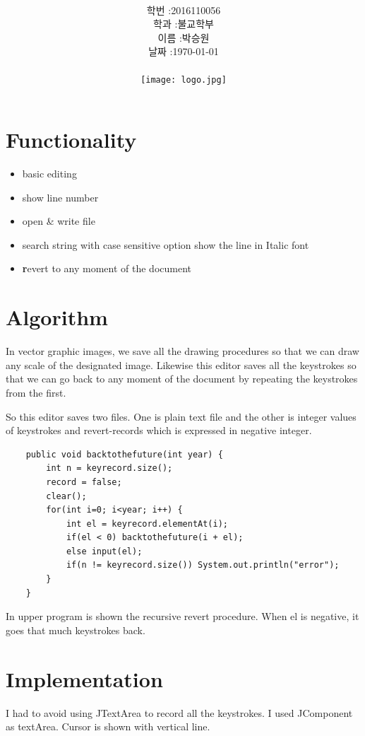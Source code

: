 \documentclass[12pt,a4paper]{article}
\title{
	\centering
	\pgfornament[width=12cm,color=teal]{84}\\
	\vspace{1cm}
	\fontsize{50}{50} \selectfont {TimeMachine Editor\\ with Java}\\
		\pgfornament[width=12cm,color=teal]{88}\\
	\vfill}
\author{
	\LARGE
	\begin{tabular}{rl}
		\hline
		학번 : & 2016110056\\ 
		학과 : & 불교학부 \\
		이름 : & 박승원\\
		날짜 : & \today\\
		\hline
	\end{tabular}\vspace{2cm}
	\\
\texttt{[image: logo.jpg]}
	}
\date{}
\begin{document}
{}
\noindent
\lstset{language=java, columns=flexible, tabsize=4, frame=shadowbox, showstringspaces=false, breaklines=true, upquote=true, basicstyle=\normalsize}

\section{Functionality}
\begin{itemize}
	\item basic editing
	\item show line number 
	\item open \& write file
	\item search string with case sensitive option \textrightarrow show the line in Italic font
	\item \large\textbf revert to any moment of the document
\end{itemize}

\section{Algorithm}
In vector graphic images, we save all the drawing procedures so that we can draw any scale of the designated image.
Likewise this editor saves all the keystrokes so that we can go back to any moment of the document by repeating the keystrokes from the first.

So this editor saves two files. One is plain text file and the other is integer values of keystrokes and revert-records which is expressed in negative integer.

\begin{lstlisting}
	public void backtothefuture(int year) {
		int n = keyrecord.size();
		record = false;
		clear();
		for(int i=0; i<year; i++) {
			int el = keyrecord.elementAt(i);
			if(el < 0) backtothefuture(i + el);
			else input(el);
			if(n != keyrecord.size()) System.out.println("error"); 
		}
	}
\end{lstlisting}

In upper program is shown the recursive revert procedure. 
When el is negative, it goes that much keystrokes back. 
\section{Implementation}
I had to avoid using JTextArea to record all the keystrokes.
I used JComponent as textArea.
Cursor is shown with vertical line.
\end{document}
